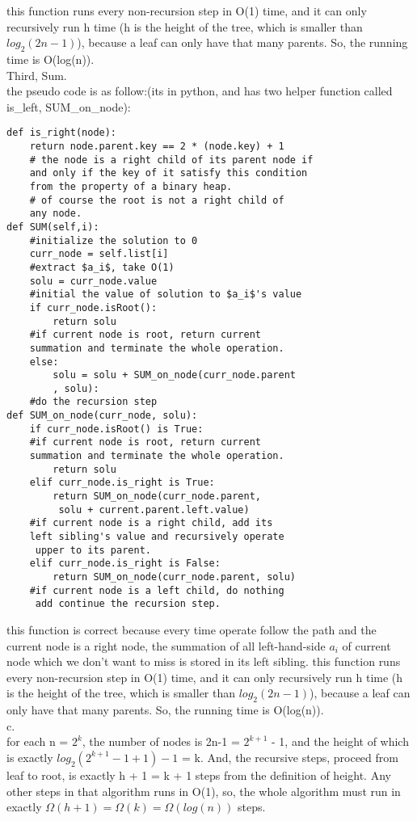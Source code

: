\documentclass{article}
\begin{document}
this function runs every non-recursion step in O(1) time, and it can only recursively run h time (h is the height of the tree, which is smaller than $log_2(2n-1)$), because a leaf can only have that many parents. So, the running time is O(log(n)).\\
Third, Sum.\\
the pseudo code is as follow:(its in python, and has two helper
function called is\_left, SUM\_on\_node):\\
\begin{lstlisting}
def is_right(node):
	return node.parent.key == 2 * (node.key) + 1
	# the node is a right child of its parent node if 
	and only if the key of it satisfy this condition
	from the property of a binary heap.
	# of course the root is not a right child of 
	any node.
def SUM(self,i):
	#initialize the solution to 0
	curr_node = self.list[i]
	#extract $a_i$, take O(1)
	solu = curr_node.value
	#initial the value of solution to $a_i$'s value
	if curr_node.isRoot():
		return solu
	#if current node is root, return current 
	summation and terminate the whole operation.
	else:
		solu = solu + SUM_on_node(curr_node.parent
		, solu):
	#do the recursion step
def SUM_on_node(curr_node, solu):
	if curr_node.isRoot() is True: 
	#if current node is root, return current 
	summation and terminate the whole operation.
		return solu
	elif curr_node.is_right is True:
		return SUM_on_node(curr_node.parent,
		 solu + current.parent.left.value)
	#if current node is a right child, add its 
	left sibling's value and recursively operate
	 upper to its parent.
	elif curr_node.is_right is False:
		return SUM_on_node(curr_node.parent, solu)
	#if current node is a left child, do nothing
	 add continue the recursion step.
\end{lstlisting}
this function is correct because every time operate follow the path and the current node is a right node, the summation of all left-hand-side $a_i$ of current node which we don't want to miss is stored in its left sibling. 
this function runs every non-recursion step in O(1) time, and it can only recursively run h time (h is the height of the tree, which is smaller than $log_2(2n-1)$), because a leaf can only have that many parents. So, the running time is O(log(n)).\\
c.\\
for each n = $2^k$, the number of nodes is 2n-1 = $2^{k+1}$ - 1, and the height of which is exactly $log_2(2^{k+1} - 1 +1 ) - 1$ = k. And, the recursive steps, proceed from leaf to root, is exactly h + 1 = k + 1 steps from the definition of height. Any other steps in that algorithm runs in O(1), so, the whole algorithm must run in exactly $\Omega(h + 1) = \Omega(k) = \Omega(log(n))$ steps.
\end{document}
